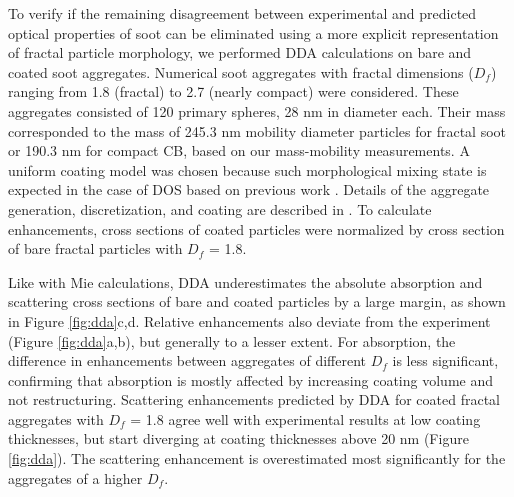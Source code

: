 To verify if the remaining disagreement between experimental and predicted optical properties of soot can be eliminated using a more explicit representation of fractal particle morphology, we performed DDA calculations on bare and coated soot aggregates. Numerical soot aggregates with fractal dimensions ($D_f$) ranging from 1.8 (fractal) to 2.7 (nearly compact) were considered. These aggregates consisted of 120 primary spheres, 28 nm in diameter each. Their mass corresponded to the mass of 245.3 nm mobility diameter particles for fractal soot or 190.3 nm for compact CB, based on our mass-mobility measurements. A uniform coating model was chosen because such morphological mixing state is expected in the case of DOS based on previous work \citep{RN70}. Details of the aggregate generation, discretization, and coating are described in \citet{RN22}. To calculate enhancements, cross sections of coated particles were normalized by cross section of bare fractal particles with $D_f$ = 1.8.

Like with Mie calculations, DDA underestimates the absolute absorption and scattering cross sections of bare and coated particles by a large margin, as shown in Figure \ref{fig:dda}c,d. Relative enhancements also deviate from the experiment (Figure \ref{fig:dda}a,b), but generally to a lesser extent. For absorption, the difference in enhancements between aggregates of different $D_f$ is less significant, confirming that absorption is mostly affected by increasing coating volume and not restructuring. Scattering enhancements predicted by DDA for coated fractal aggregates with $D_f$ = 1.8 agree well with experimental results at low coating thicknesses, but start diverging at coating thicknesses above 20 nm (Figure \ref{fig:dda}). The scattering enhancement is overestimated most significantly for the aggregates of a higher $D_f$.


